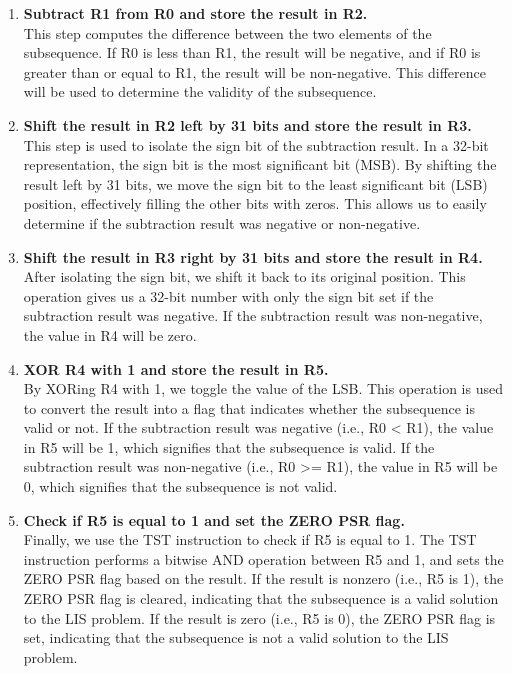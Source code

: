 \begin{enumerate}
    \item \textbf{Subtract R1 from R0 and store the result in R2.} \\
    This step computes the difference between the two elements of the subsequence. If R0 is less than R1, the result will be negative, and if R0 is greater than or equal to R1, the result will be non-negative. This difference will be used to determine the validity of the subsequence.
    
    \item \textbf{Shift the result in R2 left by 31 bits and store the result in R3.} \\
    This step is used to isolate the sign bit of the subtraction result. In a 32-bit representation, the sign bit is the most significant bit (MSB). By shifting the result left by 31 bits, we move the sign bit to the least significant bit (LSB) position, effectively filling the other bits with zeros. This allows us to easily determine if the subtraction result was negative or non-negative.
    
    \item \textbf{Shift the result in R3 right by 31 bits and store the result in R4.} \\
    After isolating the sign bit, we shift it back to its original position. This operation gives us a 32-bit number with only the sign bit set if the subtraction result was negative. If the subtraction result was non-negative, the value in R4 will be zero.
    
    \item \textbf{XOR R4 with 1 and store the result in R5.} \\
    By XORing R4 with 1, we toggle the value of the LSB. This operation is used to convert the result into a flag that indicates whether the subsequence is valid or not. If the subtraction result was negative (i.e., R0 < R1), the value in R5 will be 1, which signifies that the subsequence is valid. If the subtraction result was non-negative (i.e., R0 >= R1), the value in R5 will be 0, which signifies that the subsequence is not valid.
    
    \item \textbf{Check if R5 is equal to 1 and set the ZERO PSR flag.} \\
    Finally, we use the TST instruction to check if R5 is equal to 1. The TST instruction performs a bitwise AND operation between R5 and 1, and sets the ZERO PSR flag based on the result. If the result is nonzero (i.e., R5 is 1), the ZERO PSR flag is cleared, indicating that the subsequence is a valid solution to the LIS problem. If the result is zero (i.e., R5 is 0), the ZERO PSR flag is set, indicating that the subsequence is not a valid solution to the LIS problem.
\end{enumerate}

